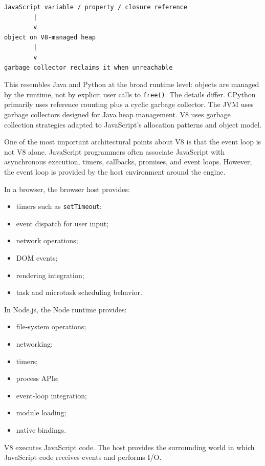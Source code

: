 \begin{verbatim}
JavaScript variable / property / closure reference
        |
        v
object on V8-managed heap
        |
        v
garbage collector reclaims it when unreachable
\end{verbatim}

This resembles Java and Python at the broad runtime level: objects are managed by the runtime, not by explicit user calls to \texttt{free()}. The details differ. CPython primarily uses reference counting plus a cyclic garbage collector. The JVM uses garbage collectors designed for Java heap management. V8 uses garbage collection strategies adapted to JavaScript's allocation patterns and object model.

One of the most important architectural points about V8 is that the event loop is not V8 alone. JavaScript programmers often associate JavaScript with asynchronous execution, timers, callbacks, promises, and event loops. However, the event loop is provided by the host environment around the engine.

In a browser, the browser host provides:

\begin{itemize}
    \item timers such as \texttt{setTimeout};
    \item event dispatch for user input;
    \item network operations;
    \item DOM events;
    \item rendering integration;
    \item task and microtask scheduling behavior.
\end{itemize}

In Node.js, the Node runtime provides:

\begin{itemize}
    \item file-system operations;
    \item networking;
    \item timers;
    \item process APIs;
    \item event-loop integration;
    \item module loading;
    \item native bindings.
\end{itemize}

V8 executes JavaScript code. The host provides the surrounding world in which JavaScript code receives events and performs I/O.

